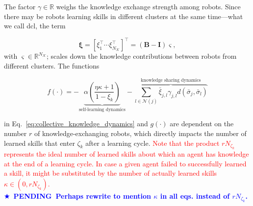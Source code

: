 \documentclass[12pt]{article}
\newcommand\myhl[1]{\textcolor{red}{#1}}
\newcommand*{\pending}[1]{\textcolor{blue}{$\bigstar$~\textbf{PENDING~#1}}}
\begin{document}
The factor $\gamma \in \mathbb{R} $ weighs the knowledge exchange strength among robots. Since there may be robots learning skills in different clusters at the same time---what we call \ac{dcl}, the term

\begin{equation} 
	\bm{\xi} = [\xi^\intercal_1 \cdots \xi^\intercal_{N_\mathcal{K}}]^\intercal = (\bm{B} - \bm{I}) \bm{\varsigma} ,
\end{equation}
with $\bm{\varsigma} \in \mathbb{R}^{N_\mathcal{K}}$; scales down the knowledge contributions between robots from different clusters. The functions

\begin{equation}\label{eq:f_function_collective}
	f(\cdot) = -\underbrace{\alpha \left( \frac{\eta \kappa + 1}{1 - \xi_k} \right)}_{\text{self-learning dynamics}}  - \overbrace{\sum_{l \in \mathcal{N}(j)} \bar{\xi}_{j,l} \gamma_{j,l}d(\bar{\sigma}_j,\bar{\sigma}_l)}^{\text{knowledge sharing dynamics}}
\end{equation}

\noindent in Eq.~\eqref{eq:collective_knowledge_dynamics} and $g(\cdot)$ are dependent on the number $r$ of knowledge-exchanging robots, which directly impacts the number of learned skills that enter $\zeta_k$ after a learning cycle. \myhl{Note that the product $r N_{\zeta_k}$ represents the ideal number of learned skills about which an agent has knowledge at the end of a learning cycle. In case a given agent failed to successfully learned a skill, it might be substituted by the number of actually learned skills $\kappa \in (0, r N_{\zeta_k})$.}\\
\pending{Perhaps rewrite to mention $\kappa$ in all eqs. instead of $r N_{\zeta_k}$.}
\end{document}
